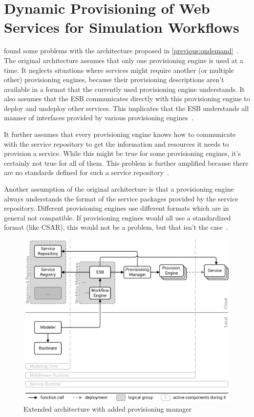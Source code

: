 \section{Dynamic Provisioning of Web Services for Simulation Workflows}
\label{previous:dynamic}

\citeauthor*{provisioning:dynamic} found some problems with the architecture proposed in \autoref{previous:ondemand}~\autocite{provisioning:dynamic}.
The original architecture assumes that only one provisioning engine is used at a time.
It neglects situations where services might require another (or multiple other) provisioning engines, because their provisioning descriptions aren't available in a format that the currently used provisioning engine understands.
It also assumes that the ESB communicates directly with this provisioning engine to deploy and undeploy other services.
This implicates that the ESB understands all manner of interfaces provided by various provisioning engines~\autocite{provisioning:dynamic}.

It further assumes that every provisioning engine knows how to communicate with the service repository to get the information and resources it needs to provision a service.
While this might be true for some provisioning engines, it's certainly not true for all of them.
This problem is further amplified because there are no standards defined for such a service repository~\autocite{provisioning:dynamic}.

Another assumption of the original architecture is that a provisioning engine always understands the format of the service packages provided by the service repository.
Different provisioning engines use different formats which are in general not compatible.
If provisioning engines would all use a standardized format (like CSAR), this would not be a problem, but that isn't the case~\autocite{provisioning:dynamic}.

\begin{figure}[!htbp]
	\centering
	\includegraphics[resolution=600]{previous/assets/valeri_architecture}
	\caption{Extended architecture with added provisioning manager~\autocite[based on][]{provisioning:dynamic}}
	\label{image:valeri_architecture}
\end{figure}

